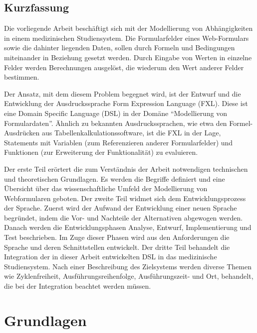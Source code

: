 \documentclass [11pt,smallheadings, a4paper]{report}
\begin{document}

\chapter*{Kurzfassung}
Die vorliegende Arbeit beschäftigt sich mit der Modellierung von Ab\-hän\-gig\-kei\-ten in einem medizinischen Studiensystem. Die Formularfelder eines Web-Formulars sowie die dahinter liegenden Daten, sollen durch Formeln und Bedingungen miteinander in Beziehung gesetzt werden. Durch Eingabe von Werten in einzelne Felder werden Berechnungen ausgelöst, die wiederum den Wert anderer Felder bestimmen.

Der Ansatz, mit dem diesem Problem begegnet wird, ist der Entwurf und die Entwicklung der Ausdruckssprache Form Expression Language (FXL). Diese ist eine Domain Specific Language (DSL) in der Domäne ``Modellierung von Formulardaten''. Ähnlich zu bekannten Ausdruckssprachen, wie etwa den Formel-Ausdrücken aus Tabellenkalkulationssoftware, ist die FXL in der Lage, Statements mit Variablen (zum Referenzieren anderer For\-mu\-lar\-fel\-der) und Funktionen (zur Erweiterung der Funktionalität) zu evaluieren.

Der erste Teil erörtert die zum Verständnis der Arbeit notwendigen technischen und theoretischen Grundlagen. Es werden die Begriffe definiert und eine Über\-sicht über das wissenschaftliche Umfeld der Modellierung von Webformularen geboten.
Der zweite Teil widmet sich dem Entwicklungsprozess der Sprache. Zuerst wird der Aufwand der Entwicklung einer neuen Sprache begründet, indem die Vor- und Nachteile der Alternativen abgewogen werden. Danach werden die Entwicklungsphasen Analyse, Entwurf, Implementierung und Test beschrieben. Im Zuge dieser Phasen wird aus den Anforderungen die Sprache und deren Schnittstellen entwickelt.
Der dritte Teil behandelt die Integration der in dieser Arbeit entwickelten DSL in das medizinische Studiensystem. Nach einer Beschreibung des Zielsystems werden diverse Themen wie Zyklenfreiheit, Ausführungsreihenfolge, Ausführungszeit- und Ort, behandelt, die bei der Integration beachtet werden müssen.







\part{Grundlagen}
\label{part_grundlagen}

\end{document}

